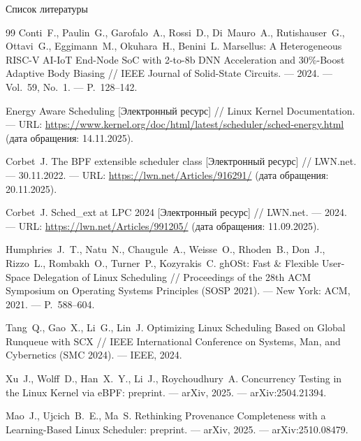 \documentclass[aspectratio=169,11pt]{beamer}
\begin{document}
\begin{frame}[allowframebreaks]{Список литературы}
\begin{thebibliography}{99}
                Conti~F., Paulin~G., Garofalo~A., Rossi~D., Di~Mauro~A.,
                Rutishauser~G., Ottavi~G., Eggimann~M., Okuhara~H.,
                Benini~L. Marsellus: A Heterogeneous RISC-V AI-IoT
                End-Node SoC with 2-to-8b DNN Acceleration and
                30\%-Boost Adaptive Body Biasing // IEEE Journal of
                Solid-State Circuits. --- 2024. --- Vol.~59, No.~1. ---
                P.~128--142.

                Energy Aware Scheduling [Электронный ресурс] // Linux
                Kernel Documentation. ---
                URL: \url{https://www.kernel.org/doc/html/latest/scheduler/sched-energy.html}
                (дата обращения: 14.11.2025).

                Corbet~J. The BPF extensible scheduler class
                [Электронный ресурс] // LWN.net. --- 30.11.2022. ---
                URL: \url{https://lwn.net/Articles/916291/}
                (дата обращения: 20.11.2025).

                Corbet~J. Sched\_ext at LPC 2024 [Электронный ресурс] //
                LWN.net. --- 2024. ---
                URL: \url{https://lwn.net/Articles/991205/}
                (дата обращения: 11.09.2025).

                Humphries~J.~T., Natu~N., Chaugule~A., Weisse~O.,
                Rhoden~B., Don~J., Rizzo~L., Rombakh~O., Turner~P.,
                Kozyrakis~C. ghOSt: Fast \& Flexible User-Space Delegation
                of Linux Scheduling // Proceedings of the 28th ACM
                Symposium on Operating Systems Principles (SOSP 2021). ---
                New York: ACM, 2021. --- P.~588--604.

                Tang~Q., Gao~X., Li~G., Lin~J. Optimizing Linux Scheduling
                Based on Global Runqueue with SCX // IEEE International
                Conference on Systems, Man, and Cybernetics (SMC 2024). ---
                IEEE, 2024.

                Xu~J., Wolff~D., Han~X.~Y., Li~J., Roychoudhury~A.
                Concurrency Testing in the Linux Kernel via eBPF:
                preprint. --- arXiv, 2025. --- arXiv:2504.21394.

                Mao~J., Ujcich~B.~E., Ma~S. Rethinking Provenance
                Completeness with a Learning-Based Linux Scheduler:
                preprint. --- arXiv, 2025. --- arXiv:2510.08479.


\end{thebibliography}
\end{frame}
\end{document}
